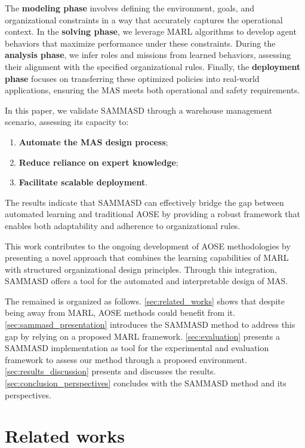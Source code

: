 \documentclass[sigconf,anonymous]{aamas}
\begin{document}
The \textbf{modeling phase} involves defining the environment, goals, and organizational constraints in a way that accurately captures the operational context. In the \textbf{solving phase}, we leverage MARL algorithms to develop agent behaviors that maximize performance under these constraints. During the \textbf{analysis phase}, we infer roles and missions from learned behaviors, assessing their alignment with the specified organizational rules. Finally, the \textbf{deployment phase} focuses on transferring these optimized policies into real-world applications, ensuring the MAS meets both operational and safety requirements.

In this paper, we validate SAMMASD through a warehouse management scenario, assessing its capacity to:
%
\begin{enumerate}[label={\roman*)}]
  \item \textbf{Automate the MAS design process};
  \item \textbf{Reduce reliance on expert knowledge};
  \item \textbf{Facilitate scalable deployment}.
\end{enumerate}

\noindent The results indicate that SAMMASD can effectively bridge the gap between automated learning and traditional AOSE by providing a robust framework that enables both adaptability and adherence to organizational rules.


This work contributes to the ongoing development of AOSE methodologies by presenting a novel approach that combines the learning capabilities of MARL with structured organizational design principles. Through this integration, SAMMASD offers a tool for the automated and interpretable design of MAS.

The remained is organized as follows. \autoref{sec:related_works} shows that despite being away from MARL, AOSE methods could benefit from it. \autoref{sec:sammasd_presentation} introduces the SAMMASD method to address this gap by relying on a proposed MARL framework. \autoref{sec:evaluation} presents a SAMMASD implementation as tool for the experimental and evaluation framework to assess our method through a proposed environment. \autoref{sec:results_discussion} presents and discusses the results. \autoref{sec:conclusion_perspectives} concludes with the SAMMASD method and its perspectives.

\section{Related works}
\label{sec:related_works}
\end{document}
